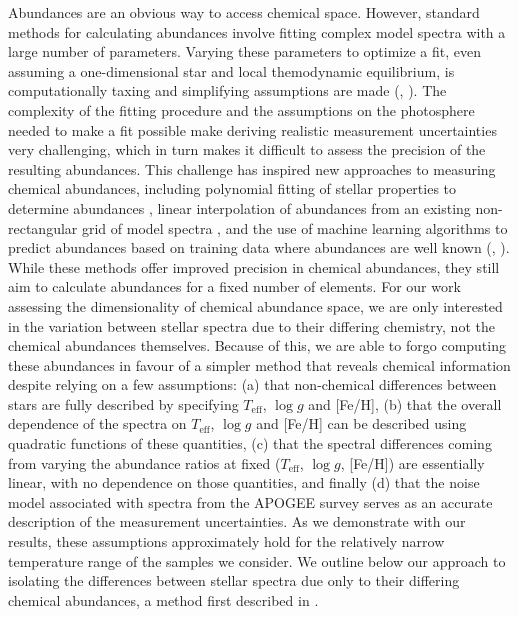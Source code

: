 \documentclass[a4paper,fleqn,usenatbib]{mnras}
\newcommand       \teff     {{T_{\mathrm{eff}}}}
\begin{document}
Abundances are an obvious way to access chemical space. However, standard methods for calculating abundances involve fitting complex model spectra with a large number of parameters. Varying these parameters to optimize a fit, even assuming a one-dimensional star and local themodynamic equilibrium, is computationally taxing and simplifying assumptions are made (\citealt{Smiljanic2014}, \citealt{Perez2015}). The complexity of the fitting procedure and the assumptions on the photosphere needed to make a fit possible make deriving realistic measurement uncertainties very challenging, which in turn makes it difficult to assess the precision of the resulting abundances. This challenge has inspired new approaches to measuring chemical abundances, including polynomial fitting of stellar properties to determine abundances \citep{Rix2016}, linear interpolation of abundances from an existing non-rectangular grid of model spectra \citep{Ting2016}, and the use of machine learning algorithms to predict abundances based on training data where abundances are well known (\citealt{Ness2015}, \citealt{Casey2016a}). While these methods offer improved precision in chemical abundances, they still aim to calculate abundances for a fixed number of elements. For our work assessing the dimensionality of chemical abundance space, we are only interested in the variation between stellar spectra due to their differing chemistry, not the chemical abundances themselves. Because of this, we are able to forgo computing these abundances in favour of a simpler method that reveals chemical information despite relying on a few assumptions: (a) that non-chemical differences between stars are fully described by specifying $\teff$, $\log g$ and [Fe/H], (b) that the overall dependence of the spectra on $\teff$, $\log g$ and [Fe/H] can be described using quadratic functions of these quantities, (c) that the spectral differences coming from varying the abundance ratios at fixed ($\teff$, $\log g$, [Fe/H]) are essentially linear, with no dependence on those quantities, and finally (d) that the noise model associated with spectra from the APOGEE survey serves as an accurate description of the measurement uncertainties. As we demonstrate with our results, these assumptions approximately hold for the relatively narrow temperature range of the samples we consider. We outline below our approach to isolating the differences between stellar spectra due only to their differing chemical abundances, a method first described in \citet{Bovy2016}. 
\end{document}
